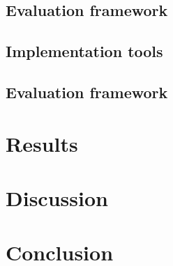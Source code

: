 \documentclass[pdftex,10pt,a4paper,oneside]{article}
\numberwithin{equation}{section}
\begin{document}
\subsection*{Evaluation framework}

\newpage

\subsection*{Implementation tools}

\newpage





\newpage


\newpage

\subsection*{Evaluation framework}

\newpage






\newpage

\section{Results}\label{sec:4-results}
\newpage

\section{Discussion}\label{sec:5-discussion}
\newpage

\section{Conclusion}\label{sec:6-conclusion}
\newpage



\newpage


\end{document}

